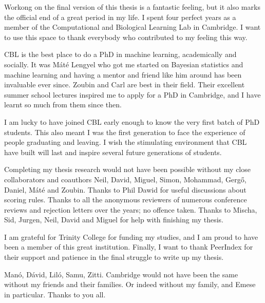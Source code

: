\begin{acknowledgements}

Workong on the final version of this thesis is a fantastic feeling, but it also marks the official end of a great period in my life. I spent four perfect years as a member of the Computational and Biological Learning Lab in Cambridge. I want to use this space to thank everybody who contributed to my feeling this way.

CBL is the best place to do a PhD in machine learning, academically and socially. It was M\'{a}t\'{e} Lengyel who got me started on Bayesian statistics and machine learning and having a mentor and friend like him around has been invaluable ever since. Zoubin and Carl are best in their field. Their excellent summer school lectures inspired me to apply for a PhD in Cambridge, and I have learnt so much from them since then.

I am lucky to have joined CBL early enough to know the very first batch of PhD students. This also meant I was the first generation to face the experience of people graduating and leaving. I wish the stimulating environment that CBL have built will last and inspire several future generations of students.

Completing my thesis research would not have been possible without my close collaborators and coauthors Neil, David, Miguel, Simon, Mohammad, Gerg\H{o}, Daniel, M\'{a}t\'{e} and Zoubin. Thanks to Phil Dawid for useful discussions about scoring rules. Thanks to all the anonymous reviewers of numerous conference reviews and rejection letters over the years; no offence taken. Thanks to Mischa, Sid, Jurgen, Neil, David and Miguel for help with finishing my thesis. 

I am grateful for Trinity College for funding my studies, and I am proud to have been a member of this great institution. Finally, I want to thank PeerIndex for their support and patience in the final struggle to write up my thesis.

Man\'{o}, D\'{a}vid, Lil\'{o}, Samu, Zitti. Cambridge would not have been the same without my friends and their families. Or indeed without my family, and Emese in particular. Thanks to you all.

\end{acknowledgements}